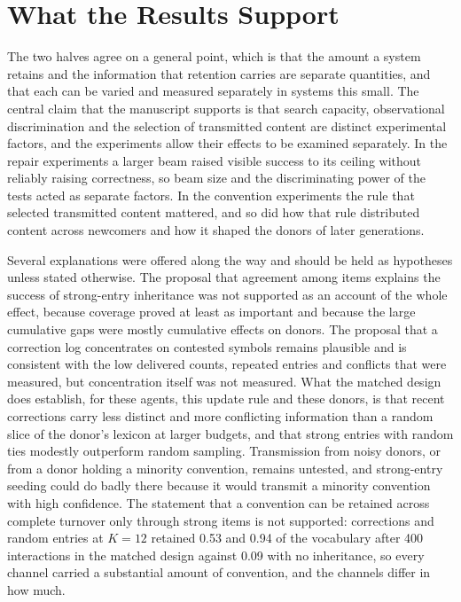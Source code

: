 \documentclass[11pt]{article}
\begin{document}
\section{What the Results Support}

The two halves agree on a general point, which is that the amount a system retains and the information that retention carries are separate quantities, and that each can be varied and measured separately in systems this small. The central claim that the manuscript supports is that search capacity, observational discrimination and the selection of transmitted content are distinct experimental factors, and the experiments allow their effects to be examined separately. In the repair experiments a larger beam raised visible success to its ceiling without reliably raising correctness, so beam size and the discriminating power of the tests acted as separate factors. In the convention experiments the rule that selected transmitted content mattered, and so did how that rule distributed content across newcomers and how it shaped the donors of later generations.

Several explanations were offered along the way and should be held as hypotheses unless stated otherwise. The proposal that agreement among items explains the success of strong-entry inheritance was not supported as an account of the whole effect, because coverage proved at least as important and because the large cumulative gaps were mostly cumulative effects on donors. The proposal that a correction log concentrates on contested symbols remains plausible and is consistent with the low delivered counts, repeated entries and conflicts that were measured, but concentration itself was not measured. What the matched design does establish, for these agents, this update rule and these donors, is that recent corrections carry less distinct and more conflicting information than a random slice of the donor's lexicon at larger budgets, and that strong entries with random ties modestly outperform random sampling. Transmission from noisy donors, or from a donor holding a minority convention, remains untested, and strong-entry seeding could do badly there because it would transmit a minority convention with high confidence. The statement that a convention can be retained across complete turnover only through strong items is not supported: corrections and random entries at $K=12$ retained 0.53 and 0.94 of the vocabulary after 400 interactions in the matched design against 0.09 with no inheritance, so every channel carried a substantial amount of convention, and the channels differ in how much.
\end{document}
